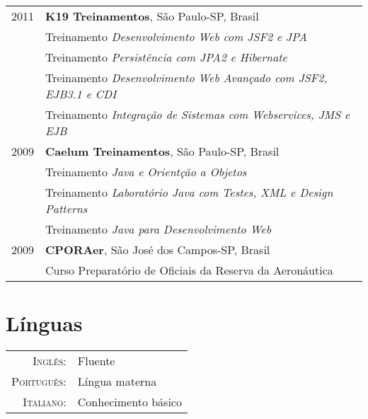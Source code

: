 \documentclass[a4paper,10pt]{article} %
\begin{document}
\begin{tabular}{r|p{11cm}}

2011 & \textbf{K19 Treinamentos}, S\~ao Paulo-SP, Brasil\\
    & \footnotesize{Treinamento \emph{Desenvolvimento Web com JSF2 e JPA}}\\
    & \footnotesize{Treinamento \emph{Persist\^{e}ncia com JPA2 e Hibernate}}\\
    & \footnotesize{Treinamento \emph{Desenvolvimento Web Avançado com JSF2, EJB3.1 e CDI}}\\
    & \footnotesize{Treinamento \emph{Integração de Sistemas com Webservices, JMS e EJB}}\multicolumn{2}{c}{} \\

2009 & \textbf{Caelum Treinamentos}, S\~{a}o Paulo-SP, Brasil\\
    & \footnotesize{Treinamento \emph{Java e Orientção a Objetos}}\\
    & \footnotesize{Treinamento \emph{Laboratório Java com Testes, XML e Design Patterns}}\\
    & \footnotesize{Treinamento \emph{Java para Desenvolvimento Web}}\multicolumn{2}{c}{} \\

2009 & \textbf{CPORAer}, São José dos Campos-SP, Brasil\\
    & \footnotesize{Curso Preparatório de Oficiais da Reserva da Aeronáutica}\\

\end{tabular}


\section{Línguas}

\begin{tabular}{rl}
\textsc{Inglês:} & Fluente\\

\textsc{Português:} & Língua materna\\

\textsc{Italiano:} & Conhecimento básico\\
\end{tabular}

\end{document}
